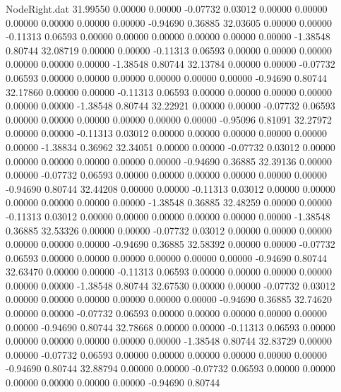 \begin{filecontents}{NodeRight.dat}
  31.99550    0.00000    0.00000    -0.07732    0.03012    0.00000    0.00000    0.00000    0.00000    0.00000    0.00000   -0.94690    0.36885
  32.03605    0.00000    0.00000    -0.11313    0.06593    0.00000    0.00000    0.00000    0.00000    0.00000    0.00000   -1.38548    0.80744
  32.08719    0.00000    0.00000    -0.11313    0.06593    0.00000    0.00000    0.00000    0.00000    0.00000    0.00000   -1.38548    0.80744
  32.13784    0.00000    0.00000    -0.07732    0.06593    0.00000    0.00000    0.00000    0.00000    0.00000    0.00000   -0.94690    0.80744
  32.17860    0.00000    0.00000    -0.11313    0.06593    0.00000    0.00000    0.00000    0.00000    0.00000    0.00000   -1.38548    0.80744
  32.22921    0.00000    0.00000    -0.07732    0.06593    0.00000    0.00000    0.00000    0.00000    0.00000    0.00000   -0.95096    0.81091
  32.27972    0.00000    0.00000    -0.11313    0.03012    0.00000    0.00000    0.00000    0.00000    0.00000    0.00000   -1.38834    0.36962
  32.34051    0.00000    0.00000    -0.07732    0.03012    0.00000    0.00000    0.00000    0.00000    0.00000    0.00000   -0.94690    0.36885
  32.39136    0.00000    0.00000    -0.07732    0.06593    0.00000    0.00000    0.00000    0.00000    0.00000    0.00000   -0.94690    0.80744
  32.44208    0.00000    0.00000    -0.11313    0.03012    0.00000    0.00000    0.00000    0.00000    0.00000    0.00000   -1.38548    0.36885
  32.48259    0.00000    0.00000    -0.11313    0.03012    0.00000    0.00000    0.00000    0.00000    0.00000    0.00000   -1.38548    0.36885
  32.53326    0.00000    0.00000    -0.07732    0.03012    0.00000    0.00000    0.00000    0.00000    0.00000    0.00000   -0.94690    0.36885
  32.58392    0.00000    0.00000    -0.07732    0.06593    0.00000    0.00000    0.00000    0.00000    0.00000    0.00000   -0.94690    0.80744
  32.63470    0.00000    0.00000    -0.11313    0.06593    0.00000    0.00000    0.00000    0.00000    0.00000    0.00000   -1.38548    0.80744
  32.67530    0.00000    0.00000    -0.07732    0.03012    0.00000    0.00000    0.00000    0.00000    0.00000    0.00000   -0.94690    0.36885
  32.74620    0.00000    0.00000    -0.07732    0.06593    0.00000    0.00000    0.00000    0.00000    0.00000    0.00000   -0.94690    0.80744
  32.78668    0.00000    0.00000    -0.11313    0.06593    0.00000    0.00000    0.00000    0.00000    0.00000    0.00000   -1.38548    0.80744
  32.83729    0.00000    0.00000    -0.07732    0.06593    0.00000    0.00000    0.00000    0.00000    0.00000    0.00000   -0.94690    0.80744
  32.88794    0.00000    0.00000    -0.07732    0.06593    0.00000    0.00000    0.00000    0.00000    0.00000    0.00000   -0.94690    0.80744

\end{filecontents}
